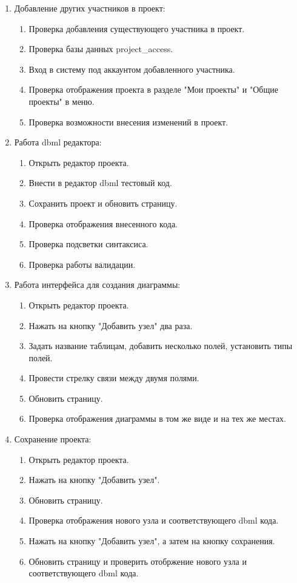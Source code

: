 \begin{enumerate}
 \item Добавление других участников в проект:
    \begin{enumerate}
        \item Проверка добавления существующего участника в проект.
        \item Проверка базы данных project\_access.
        \item Вход в систему под аккаунтом добавленного участника.
        \item Проверка отображения проекта в разделе "Мои проекты" и "Общие проекты" в меню.
        \item Проверка возможности внесения изменений в проект.
    \end{enumerate}

 \item Работа dbml редактора:
    \begin{enumerate}
        \item Открыть редактор проекта.
        \item Внести в редактор dbml тестовый код.
        \item Сохранить проект и обновить страницу.
        \item Проверка отображения внесенного кода.
        \item Проверка подсветки синтаксиса.
        \item Проверка работы валидации.
    \end{enumerate}

 \item Работа интерфейса для создания диаграммы:
    \begin{enumerate}
        \item Открыть редактор проекта.
        \item Нажать на кнопку "Добавить узел" два раза.
        \item Задать название таблицам, добавить несколько полей, установить типы полей.
        \item Провести стрелку связи между двумя полями.
        \item Обновить страницу.
        \item Проверка отображения диаграммы в том же виде и на тех же местах.
    \end{enumerate}

 \item Сохранение проекта:
    \begin{enumerate}
        \item Открыть редактор проекта.
        \item Нажать на кнопку "Добавить узел".
        \item Обновить страницу.
        \item Проверка отображения нового узла и соответствующего dbml кода.
        \item Нажать на кнопку "Добавить узел", а затем на кнопку сохранения.
        \item Обновить страницу и проверить отобржение нового узла и соответствующего dbml кода.
    \end{enumerate}


\end{enumerate}
